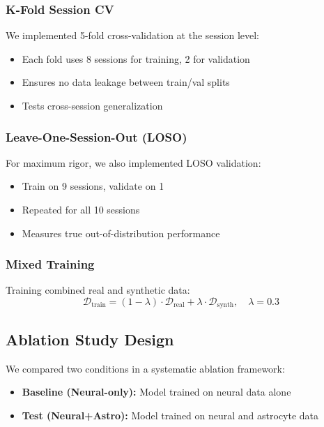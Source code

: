 \documentclass[11pt,twocolumn]{article}
\begin{document}
\subsubsection{K-Fold Session CV}
We implemented 5-fold cross-validation at the session level:
\begin{itemize}
    \item Each fold uses 8 sessions for training, 2 for validation
    \item Ensures no data leakage between train/val splits
    \item Tests cross-session generalization
\end{itemize}

\subsubsection{Leave-One-Session-Out (LOSO)}
For maximum rigor, we also implemented LOSO validation:
\begin{itemize}
    \item Train on 9 sessions, validate on 1
    \item Repeated for all 10 sessions
    \item Measures true out-of-distribution performance
\end{itemize}

\subsubsection{Mixed Training}
Training combined real and synthetic data:
\begin{equation}
\mathcal{D}_{\text{train}} = (1 - \lambda) \cdot \mathcal{D}_{\text{real}} + \lambda \cdot \mathcal{D}_{\text{synth}}, \quad \lambda = 0.3
\end{equation}

\subsection{Ablation Study Design}

We compared two conditions in a systematic ablation framework:

\begin{itemize}
    \item \textbf{Baseline (Neural-only):} Model trained on neural data alone
    \item \textbf{Test (Neural+Astro):} Model trained on neural and astrocyte data
\end{itemize}
\end{document}

